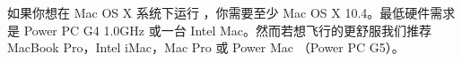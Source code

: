 如果你想在 Mac OS X 系统下运行 \FlightGear{}，你需要至少 Mac OS X 10.4。最低硬件需求是 Power PC G4 1.0GHz 或一台 Intel Mac。然而若想飞行的更舒服我们推荐 MacBook Pro，Intel iMac，Mac Pro 或 Power Mac （Power PC G5）。 
\fi
%
%
%
%
%
